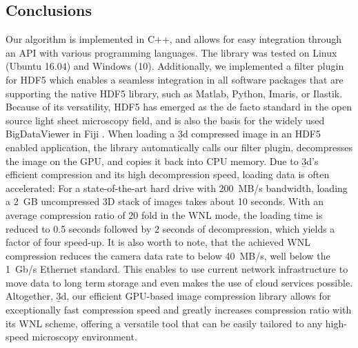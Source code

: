 \subsection{Conclusions}

Our algorithm is implemented in C++, and allows for easy integration through an API with various programming languages. The library was tested on Linux (Ubuntu 16.04) and Windows (10). Additionally, we implemented a filter plugin for HDF5 which enables a seamless integration in all software packages that are supporting the native HDF5 library, such as Matlab, Python, Imaris, or Ilastik. Because of its versatility, HDF5 has emerged as the de facto standard in the open source light sheet microscopy field, and is also the basis for the widely used BigDataViewer \cite{pietzsch_bigdataviewer:_2015} in Fiji \cite{schindelin_fiji:_2012}. When loading a \b3d compressed image in an HDF5 enabled application, the library automatically calls our filter plugin, decompresses the image on the GPU, and copies it back into CPU memory. Due to \b3d’s efficient compression and its high decompression speed, loading data is often accelerated: For a state-of-the-art hard drive with \SI{200}{MB/s} bandwidth, loading a \SI{2}{GB} uncompressed 3D stack of images takes about 10 seconds. With an average compression ratio of 20 fold in the WNL mode, the loading time is reduced to 0.5 seconds followed by 2 seconds of decompression, which yields a factor of four speed-up. It is also worth to note, that the achieved WNL compression reduces the camera data rate to below \SI{40}{MB/s}, well below the \SI{1}{Gb/s} Ethernet standard. This enables to use current network infrastructure to move data to long term storage and even makes the use of cloud services possible. Altogether, \b3d, our efficient GPU-based image compression library allows for exceptionally fast compression speed and greatly increases compression ratio with its WNL scheme, offering a versatile tool that can be easily tailored to any high-speed microscopy environment.